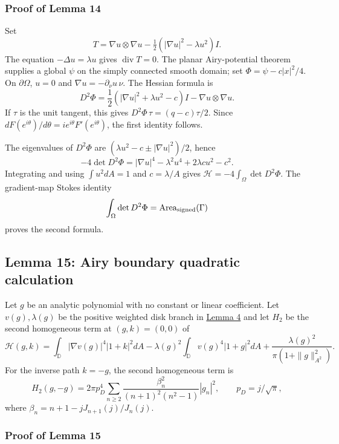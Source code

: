 \documentclass[11pt]{article}
\begin{document}
\subsubsection{Proof of Lemma 14}\label{proof-lem-airy-boundary-flux}

Set \[
T=\nabla u\otimes\nabla u-\tfrac12(|\nabla u|^2-\lambda u^2)I.
\] The equation \(-\Delta u=\lambda u\) gives \(\operatorname{div}T=0\).
The planar Airy-potential theorem supplies a global \(\psi\) on the
simply connected smooth domain; set \(\Phi=\psi-c|x|^2/4\). On
\(\partial\Omega\), \(u=0\) and \(\nabla u=-\partial_\nu u\,\nu\). The
Hessian formula is \[
D^2\Phi=\frac12(|\nabla u|^2+\lambda u^2-c)I-\nabla u\otimes\nabla u.
\] If \(\tau\) is the unit tangent, this gives
\(D^2\Phi\,\tau=(q-c)\tau/2\). Since
\(dF(e^{i\theta})/d\theta=i e^{i\theta}F'(e^{i\theta})\), the first
identity follows.

The eigenvalues of \(D^2\Phi\) are \((\lambda u^2-c\pm|\nabla u|^2)/2\),
hence \[
-4\det D^2\Phi=|\nabla u|^4-\lambda^2u^4+2\lambda c u^2-c^2.
\] Integrating and using \(\int u^2dA=1\) and \(c=\lambda/A\) gives
\(\mathscr H=-4\int_\Omega\det D^2\Phi\). The gradient-map Stokes
identity \[
\int_\Omega\det D^2\Phi=\operatorname{Area}_{\rm signed}(\Gamma)
\] proves the second formula.

\subsection{Lemma 15: Airy boundary quadratic
calculation}\label{lem-airy-boundary-quadratic}

Let \(g\) be an analytic polynomial with no constant or linear
coefficient. Let \(v(g),\lambda(g)\) be the positive weighted disk
branch in \hyperref[lem-c1-perturbation]{Lemma 4} and let \(H_2\) be the
second homogeneous term at \((g,k)=(0,0)\) of \[
\mathscr H(g,k)=\int_{\mathbb D}|\nabla v(g)|^4|1+k|^2dA
-\lambda(g)^2\int_{\mathbb D}v(g)^4|1+g|^2dA
+\frac{\lambda(g)^2}{\pi(1+\|g\|_{A^2}^2)}.
\] For the inverse path \(k=-g\), the second homogeneous term is \[
H_2(g,-g)=2\pi p_D^4\sum_{n\ge2}
\frac{\beta_n^2}{(n+1)^2(n^2-1)}|g_n|^2,
\qquad p_D=j/\sqrt\pi,
\] where \(\beta_n=n+1-jJ_{n+1}(j)/J_n(j)\).

\subsubsection{Proof of Lemma
15}\label{proof-lem-airy-boundary-quadratic}
\end{document}
